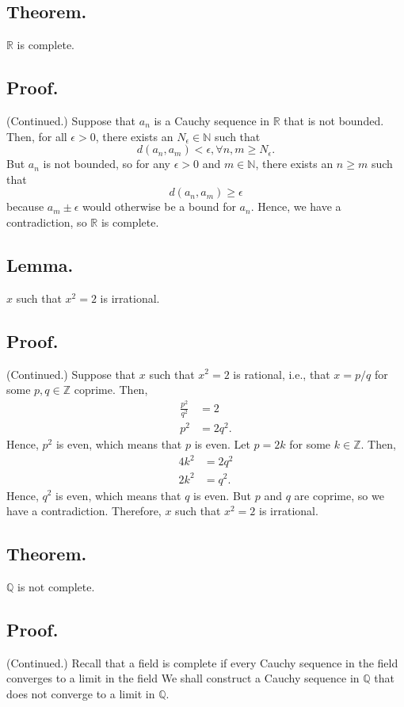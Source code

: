 \documentclass[titlepage]{article}
\begin{document}
\subsection{Theorem.} $\mathbb{R}$ is complete.

\subsection{Proof.} (Continued.) Suppose that $a_{n}$ is a Cauchy sequence in $\mathbb{R}$ that is not bounded. Then, for all $\epsilon > 0$, there exists an $N_{\epsilon} \in \mathbb{N}$ such that
$$d(a_{n}, a_{m}) < \epsilon, \forall n,m \geq N_{\epsilon}.$$
But $a_{n}$ is not bounded, so for any $\epsilon > 0$ and $m \in \mathbb{N}$, there exists an $n \geq m$ such that 
$$d(a_{n}, a_{m}) \geq \epsilon$$
because $a_{m} \pm \epsilon$ would otherwise be a bound for $a_{n}$. Hence, we have a contradiction, so $\mathbb{R}$ is complete.

\subsection{Lemma.} $x$ such that $x^{2} = 2$ is irrational.

\subsection{Proof.} (Continued.) Suppose that $x$ such that $x^{2} = 2$ is rational, i.e., that $x = p/q$ for some $p,q \in \mathbb{Z}$ coprime. Then, 
\begin{align*}
    \frac{p^{2}}{q^{2}} &= 2 \\
                  p^{2} &= 2q^{2}.
\end{align*}
Hence, $p^{2}$ is even, which means that $p$ is even. Let $p = 2k$ for some $k \in \mathbb{Z}$. Then, 
\begin{align*}
    4k^{2} &= 2q^{2} \\
    2k^{2} &= q^{2}.
\end{align*}
Hence, $q^{2}$ is even, which means that $q$ is even. But $p$ and $q$ are coprime, so we have a contradiction. Therefore, $x$ such that $x^{2} = 2$ is irrational.

\subsection{Theorem.} $\mathbb{Q}$ is not complete.

\subsection{Proof.} (Continued.) Recall that a field is complete if every Cauchy sequence in the field converges to a limit in the field We shall construct a Cauchy sequence in $\mathbb{Q}$ that does not converge to a limit in $\mathbb{Q}$. 
\end{document}
